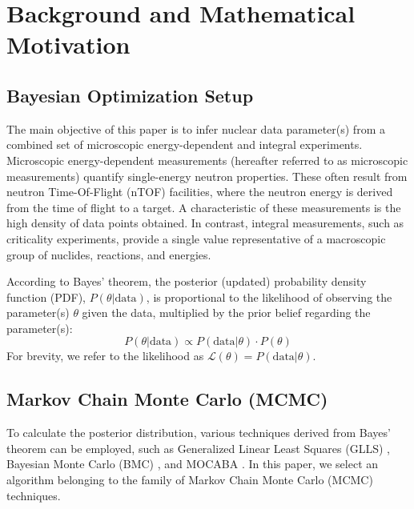\documentclass[preprint,review,12pt]{elsarticle}
\begin{document}
\section{Background and Mathematical Motivation}
\subsection{Bayesian Optimization Setup}
The main objective of this paper is to infer nuclear data parameter(s) from a combined set of microscopic energy-dependent and integral experiments. Microscopic energy-dependent measurements (hereafter referred to as microscopic measurements) quantify single-energy neutron properties. These often result from neutron Time-Of-Flight (nTOF) facilities, where the neutron energy is derived from the time of flight to a target. A characteristic of these measurements is the high density of data points obtained. In contrast, integral measurements, such as criticality experiments, provide a single value representative of a macroscopic group of nuclides, reactions, and energies.

According to Bayes' theorem, the posterior (updated) probability density function (PDF), $P(\theta|\text{data})$, is proportional to the likelihood of observing the parameter(s) $\theta$ given the data, multiplied by the prior belief regarding the parameter(s):
\begin{equation}
    P(\theta|\text{data}) \propto  P(\text{data}|\theta)\cdot P(\theta)
\end{equation}
For brevity, we refer to the likelihood as $\mathcal{L}(\theta)=P(\text{data}|\theta)$.

\subsection{Markov Chain Monte Carlo (MCMC)}
To calculate the posterior distribution, various techniques derived from Bayes' theorem can be employed, such as Generalized Linear Least Squares (GLLS) \cite{hoeferLimitationsGeneralizedLinear}, Bayesian Monte Carlo (BMC) \cite{rochmanMonteCarloNuclear2018a}, and MOCABA \cite{hoeferMOCABAGeneralMonte2015}. In this paper, we select an algorithm belonging to the family of Markov Chain Monte Carlo (MCMC) techniques. 
\end{document}
